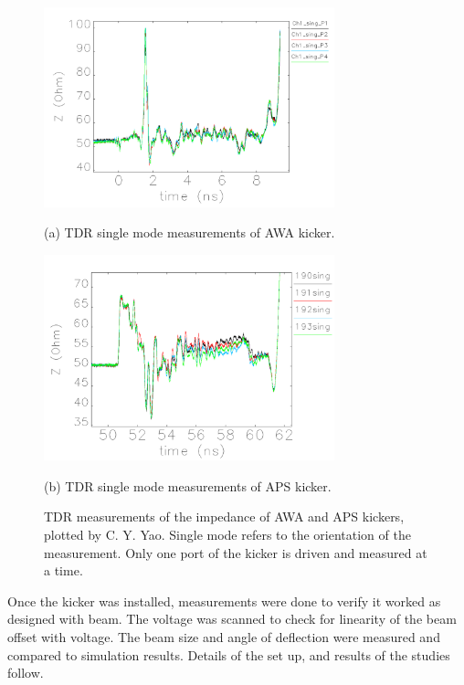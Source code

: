	\begin{figure}
		\begin{center}
			\includegraphics[width=0.75\textwidth]{./images/TDR_AWA_kicker}
			
			(a) TDR single mode measurements of AWA kicker.
		\end{center}
		\begin{center}
		\includegraphics[width=0.75\textwidth]{./images/TDR_APS_kicker}
	
		(b) TDR single mode measurements of APS kicker.
		\caption{TDR measurements of the impedance of AWA and APS kickers, plotted by C. Y. Yao.
		Single mode refers to the orientation of the measurement. 
		Only one port of the kicker is driven and measured at a time. }\label{fig:TDR}		
		\end{center}
	
	\end{figure}



Once the kicker was installed, measurements were done to verify it worked as designed with beam.  
The voltage was scanned to check for linearity of the beam offset with voltage.  
The beam size and angle of deflection were measured and compared to simulation results.  
Details of the set up, and results of the studies follow.

